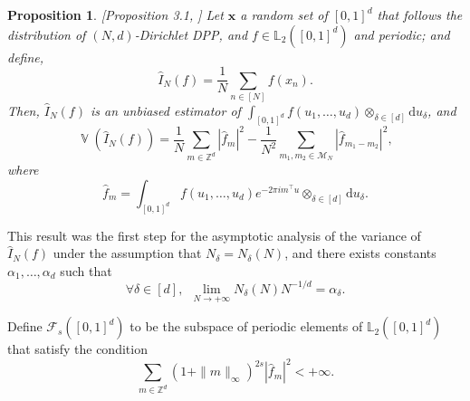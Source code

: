 \documentclass[twoside,11pt]{book}
\newtheorem{proposition}{Proposition}
\numberwithin{theorem}{chapter}
\numberwithin{definition}{chapter}
\numberwithin{proposition}{chapter}
\numberwithin{corollary}{chapter}
\numberwithin{example}{chapter}
\numberwithin{lemma}{chapter}
\DeclareMathOperator{\Tran}{\intercal}
\DeclareMathOperator{\Var}{\mathbb{V}}
\begin{document}
\begin{proposition}\label{prop:dirichlet_estimator} [Proposition 3.1, \citep{CoMaAm20} ]
Let $\bm{x}$ a random set of $[0,1]^{d}$ that follows the distribution of $(N,d)$-Dirichlet DPP, and $f \in \mathbb{L}_{2}([0,1]^{d})$ and periodic; and define, 
\begin{equation}
\hat{I}_{N}(f) =  \frac{1}{N} \sum\limits_{n \in [N]}f(x_{n}).
\end{equation}
Then, $\hat{I}_{N}(f)$ is an unbiased estimator of $\displaystyle \int_{[0,1]^{d}} f(u_{1}, \dots, u_{d}) \otimes_{\delta \in [d]} \mathrm{d}u_{\delta}$, and
\begin{equation}
\Var (\hat{I}_{N}(f)) = \frac{1}{N}\sum\limits_{m \in \mathbb{Z}^{d}} |\hat{f}_{m}|^{2} - \frac{1}{N^2} \sum\limits_{m_{1},m_{2} \in \mathcal{M}_{N}} |\hat{f}_{m_{1}-m_{2}}|^{2},
\end{equation}
where
\begin{equation}
 \hat{f}_{m} = \int_{[0,1]^{d}}f(u_{1}, \dots, u_{d}) e^{- 2\pi i m^{\Tran}u} \otimes_{\delta \in [d]} \mathrm{d}u_{\delta}.
\end{equation}


\end{proposition}


This result was the first step for the asymptotic analysis of the variance of $\hat{I}_{N}(f)$ under the assumption that $N_{\delta} = N_{\delta}(N)$, and there exists constants $\alpha_{1}, \dots, \alpha_{d}$ such that
\begin{equation}
\forall \delta \in [d], \:\:\lim\limits_{N \rightarrow +\infty} N_{\delta}(N)N^{-1/d} = \alpha_{\delta}.
\end{equation}

Define $\mathcal{F}_{s}([0,1]^{d})$ to be the subspace of periodic elements of $\mathbb{L}_{2}([0,1]^{d})$ that satisfy the condition
\begin{equation}
\sum\limits_{m \in \mathbb{Z}^{d}} (1+ \|m\|_{\infty})^{2s} |\hat{f}_{m}|^{2} < +\infty.
\end{equation}
\end{document}
